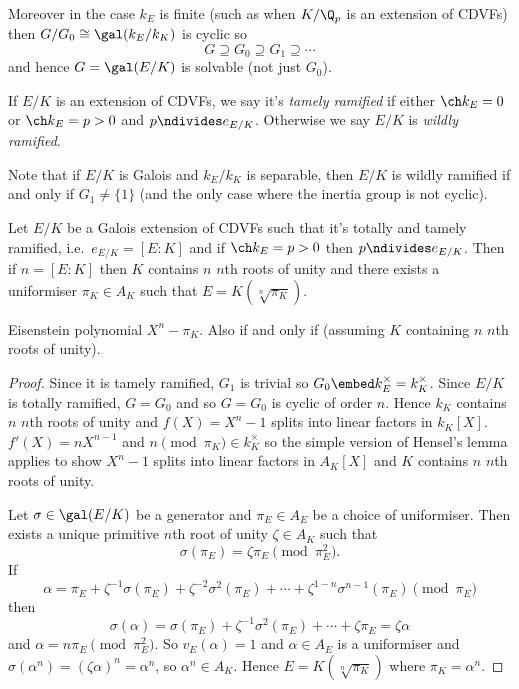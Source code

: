 \documentclass[a4paper]{article}
\begin{document}
Moreover in the case \(k_E\) is finite (such as when \(K/\Q_p\) is an extension of CDVFs) then \(G/G_0 \cong \gal(k_E/k_K)\) is cyclic so
\[
  G \supseteq G_0 \supseteq G_1 \supseteq \cdots
\]
and hence \(G = \gal(E/K)\) is solvable (not just \(G_0\)).

\begin{definition}
  If \(E/K\) is an extension of CDVFs, we say it's \emph{tamely ramified} if either \(\ch k_E = 0\) or \(\ch k_E = p > 0\) and \(p \ndivides e_{E/K}\). Otherwise we say \(E/K\) is \emph{wildly ramified}.
\end{definition}

Note that if \(E/K\) is Galois and \(k_E/k_K\) is separable, then \(E/K\) is wildly ramified if and only if \(G_1 \neq \{1\}\) (and the only case where the inertia group is not cyclic).

\begin{proposition}
  Let \(E/K\) be a Galois extension of CDVFs such that it's totally and tamely ramified, i.e.\ \(e_{E/K} = [E: K]\) and if \(\ch k_E = p > 0\) then \(p \ndivides e_{E/K}\). Then if \(n = [E: K]\) then \(K\) contains \(n\) \(n\)th roots of unity and there exists a uniformiser \(\pi_K \in A_K\) such that \(E = K(\sqrt[n]{\pi_K})\).
\end{proposition}

Eisenstein polynomial \(X^n - \pi_K\). Also if and only if (assuming \(K\) containing \(n\) \(n\)th roots of unity).

\begin{proof}
  Since it is tamely ramified, \(G_1\) is trivial so \(G_0 \embed k_E^\times = k_K^\times\). Since \(E/K\) is totally ramified, \(G = G_0\) and so \(G = G_0\) is cyclic of order \(n\). Hence \(k_K\) contains \(n\) \(n\)th roots of unity and \(f(X) = X^n - 1\) splits into linear factors in \(k_K[X]\). \(f'(X) = nX^{n - 1}\) and \(n \pmod{\pi_K} \in k_K^\times\) so the simple version of Hensel's lemma applies to show \(X^n - 1\) splits into linear factors in \(A_K[X]\) and \(K\) contains \(n\) \(n\)th roots of unity.

  Let \(\sigma \in \gal(E/K)\) be a generator and \(\pi_E \in A_E\) be a choice of uniformiser. Then exists a unique primitive \(n\)th root of unity \(\zeta \in A_K\) such that
  \[
    \sigma(\pi_E) = \zeta \pi_E \pmod{\pi_E^2}.
  \]
  If
  \[
    \alpha = \pi_E + \zeta^{-1} \sigma(\pi_E) + \zeta^{-2} \sigma^2(\pi_E) + \cdots + \zeta^{1 - n} \sigma^{n - 1}(\pi_E) \pmod{\pi_E}
  \]
  then
  \[
    \sigma(\alpha) = \sigma(\pi_E) + \zeta^{-1} \sigma^2(\pi_E) + \cdots + \zeta \pi_E = \zeta \alpha
  \]
  and \(\alpha = n \pi_E \pmod{\pi_E^2}\). So \(v_E(\alpha) = 1\) and \(\alpha \in A_E\) is a uniformiser and \(\sigma(\alpha^n) = (\zeta \alpha)^n = \alpha^n\), so \(\alpha^n \in A_K\). Hence \(E = K(\sqrt[n]{\pi_K})\) where \(\pi_K = \alpha^n\).
\end{proof}
\end{document}
